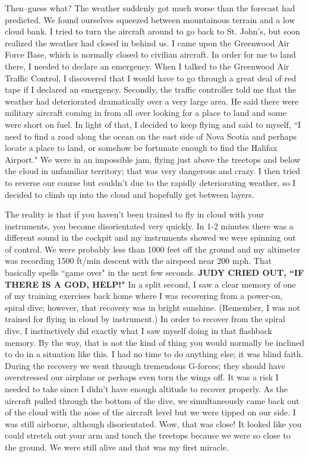 \documentclass[oneside]{book}
\begin{document}
Then--guess what? The weather suddenly got much worse than the forecast had predicted. We found ourselves squeezed between mountainous terrain and a low cloud bank. I tried to turn the aircraft around to go back to St. John's, but soon realized the weather had closed in behind us. I  came upon the Greenwood Air Force Base, which is normally closed to civilian aircraft. In order for me to land there, I needed to declare an emergency. When I talked to the Greenwood Air Traffic Control, I discovered that I would have to go through a great deal of red tape if I declared an emergency. Secondly, the traffic controller told me that the weather had deteriorated dramatically over a very large area. He said there were military aircraft coming in from all over looking for a place to land and some were short on fuel. In light of that, I decided to keep flying and said to myself, ``I need to find a road along the ocean on the east side of Nova Scotia and perhaps locate a place to land, or somehow be fortunate enough to find the Halifax Airport." We were in an impossible jam, flying just above the treetops and below the cloud in unfamiliar territory; that was very dangerous and crazy. I then tried to reverse our course but couldn't due to the rapidly deteriorating weather, so I decided to climb up into the cloud and hopefully get between layers. 

The reality is that if you haven't been trained to fly in cloud with your instruments, you become disorientated very quickly. In 1-2 minutes there was a different sound in the cockpit and my instruments showed we were spinning out of control. We were probably less than 1000 feet off the ground and my altimeter was recording 1500 ft/min descent with the airspeed near 200 mph. That basically spells ``game over" in the next few seconds. \textbf{JUDY CRIED OUT, ``IF THERE IS A GOD, HELP!"} In a split second, I saw a clear memory of one of my training exercises back home where I was recovering from a power-on, spiral dive; however, that recovery was in bright sunshine. (Remember, I was not trained for flying in cloud by instrument.) In order to recover from the spiral dive, I instinctively did exactly what I saw myself doing in that flashback memory. By the way, that is not the kind of thing you would normally be inclined to do in a situation like this. I had no time to do anything else; it was blind faith. During the recovery we went through tremendous G-forces; they should have overstressed our airplane or perhaps even torn the wings off. It was a risk I needed to take since I didn't have enough altitude to recover properly. As the aircraft pulled through the bottom of the dive, we simultaneously came back out of the cloud with the nose of the aircraft level but we were tipped on our side. I was still airborne, although disorientated. Wow, that was close! It looked like you could stretch out your arm and touch the treetops because we were so close to the ground. We were still alive and that was my first miracle. 
\end{document}
